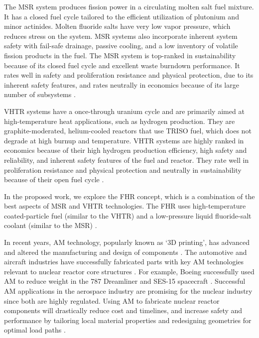 The \gls{MSR} system produces fission power in a circulating molten salt fuel mixture. 
It has a closed fuel cycle tailored to the efficient utilization of plutonium 
and minor actinides. 
Molten fluoride salts have very low vapor pressure, which reduces stress on the 
system. 
MSR systems also incorporate inherent system safety with fail-safe drainage, 
passive cooling, and a low inventory of volatile fission products in the fuel. 
The MSR system is top-ranked in sustainability because of its closed fuel cycle 
and excellent waste burndown performance. 
It rates well in safety and proliferation resistance and physical protection, 
due to its inherent safety features, and rates neutrally in economics because of
its large number of subsystems \cite{gif_technology_2002}.  

\gls{VHTR} systems have a once-through uranium cycle and are primarily aimed at 
high-temperature heat applications, such as hydrogen production. 
They are graphite-moderated, helium-cooled reactors that use \gls{TRISO} fuel, 
which does not degrade at high burnup and temperature.  
\gls{VHTR} systems are highly ranked in economics because of their high hydrogen 
production efficiency, high safety and reliability, and inherent safety features 
of the fuel and reactor. 
They rate well in proliferation resistance and physical protection and 
neutrally in sustainability because of their open fuel cycle \cite{gif_technology_2002}. 

In the proposed work, we explore the \gls{FHR} concept, which 
is a combination of the best aspects of \gls{MSR} and \gls{VHTR} technologies. 
The \gls{FHR} uses high-temperature coated-particle fuel (similar to the \gls{VHTR}) 
and a low-pressure liquid fluoride-salt coolant (similar to the \gls{MSR})
\cite{forsberg_fluoride-salt-cooled_2012,facilitators_fluoride-salt-cooled_2013}.

In recent years, \gls{AM} technology, popularly known as `3D printing', 
has advanced and altered the manufacturing and design of components 
\cite{simpson_considerations_2019}. 
The automotive and aircraft industries have successfully fabricated parts with 
key \gls{AM} technologies relevant to nuclear reactor core 
structures \cite{murr_frontiers_2016}.  
For example, Boeing successfully used \gls{AM} to reduce weight 
in the 787 Dreamliner \cite{noauthor_printed_2017} and SES-15 spacecraft 
\cite{noauthor_boeing_nodate}. 
Successful \gls{AM} applications in the aerospace industry are 
promising for the nuclear industry since both are highly regulated. 
Using \gls{AM} to fabricate nuclear reactor components will 
drastically reduce cost and timelines, and increase safety and performance by 
tailoring local material properties and redesigning geometries for optimal load paths 
\cite{simpson_considerations_2019}. 

